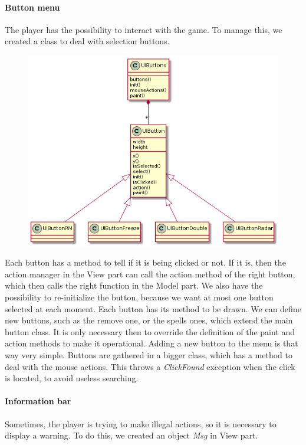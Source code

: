 \documentclass[
	a4paper
]{article}
\begin{document}
\paragraph{Button menu} The player has the possibility to interact with the game. %
To manage this, we created a class to deal with selection buttons.

%
\begin{figure}[H]
	\includegraphics[scale=0.6]{buttonDiagram.png}
\end{figure}
%

Each button has a method to tell if it is being clicked or not. %
If it is, then the action manager in the View part can call the action method of the right button, which then calls the right function in the Model part. %
We also have the possibility to re-initialize the button, because we want at most one button selected at each moment. %
Each button has its method to be drawn. %
We can define new buttons, such as the remove one, or the spells ones, which extend the main button class. %
It is only necessary then to override the definition of the paint and action methods to make it operational. %
Adding a new button to the menu is that way very simple. %
Buttons are gathered in a bigger class, which has a method to deal with the mouse actions. %
This throws a \emph{ClickFound} exception when the click is located, to avoid useless searching.


\paragraph{Information bar} Sometimes, the player is trying to make illegal actions, so it is necessary to display a warning. %
To do this, we created an object \emph{Msg} in View part.
\end{document}
